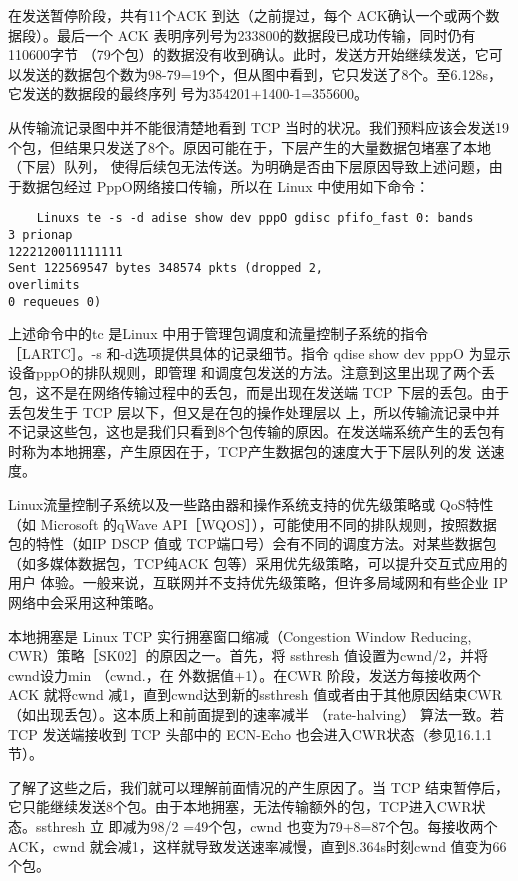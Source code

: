 在发送暂停阶段，共有11个ACK 到达（之前提过，每个 ACK确认一个或两个数据段）。最后一个 ACK 表明序列号为233800的数据段已成功传输，同时仍有110600字节
（79个包）的数据没有收到确认。此时，发送方开始继续发送，它可以发送的数据包个数为98-79=19个，但从图中看到，它只发送了8个。至6.128s，它发送的数据段的最终序列
号为354201+1400-1=355600。

从传输流记录图中并不能很清楚地看到 TCP 当时的状况。我们预料应该会发送19个包，但结果只发送了8个。原因可能在于，下层产生的大量数据包堵塞了本地（下层）队列，
使得后续包无法传送。为明确是否由下层原因导致上述问题，由于数据包经过 PppO网络接口传输，所以在 Linux 中使用如下命令：
\begin{verbatim}
    Linuxs te -s -d adise show dev pppO gdisc pfifo_fast 0: bands
3 prionap
1222120011111111
Sent 122569547 bytes 348574 pkts (dropped 2,
overlimits
0 requeues 0)
\end{verbatim}

上述命令中的tc 是Linux 中用于管理包调度和流量控制子系统的指令［LARTC］。-s 和-d选项提供具体的记录细节。指令 qdise show dev pppO 为显示设备pppO的排队规则，即管理
和调度包发送的方法。注意到这里出现了两个丢包，这不是在网络传输过程中的丢包，而是出现在发送端 TCP 下层的丢包。由于丢包发生于 TCP 层以下，但又是在包的操作处理层以
上，所以传输流记录中并不记录这些包，这也是我们只看到8个包传输的原因。在发送端系统产生的丢包有时称为本地拥塞，产生原因在于，TCP产生数据包的速度大于下层队列的发
送速度。

\begin{tcolorbox}
    Linux流量控制子系统以及一些路由器和操作系统支持的优先级策略或 QoS特性（如 Microsoft 的qWave API［WQOS］），可能使用不同的排队规则，按照数据
    包的特性（如IP DSCP 值或 TCP端口号）会有不同的调度方法。对某些数据包（如多媒体数据包，TCP纯ACK 包等）采用优先级策略，可以提升交互式应用的用户
    体验。一般来说，互联网并不支持优先级策略，但许多局域网和有些企业 IP 网络中会采用这种策略。
\end{tcolorbox}

本地拥塞是 Linux TCP 实行拥塞窗口缩减（Congestion Window Reducing, CWR）策略［SK02］的原因之一。首先，将 ssthresh 值设置为cwnd/2，并将 cwnd设力min （cwnd.，在
外数据值+1）。在CWR 阶段，发送方每接收两个 ACK 就将cwnd 减1，直到cwnd达到新的ssthresh 值或者由于其他原因结束CWR（如出现丢包）。这本质上和前面提到的速率减半
（rate-halving） 算法一致。若 TCP 发送端接收到 TCP 头部中的 ECN-Echo 也会进入CWR状态（参见16.1.1节）。

了解了这些之后，我们就可以理解前面情况的产生原因了。当 TCP 结束暂停后，它只能继续发送8个包。由于本地拥塞，无法传输额外的包，TCP进入CWR状态。ssthresh 立
即减为98/2 =49个包，cwnd 也变为79+8=87个包。每接收两个 ACK，cwnd 就会减1，这样就导致发送速率减慢，直到8.364s时刻cwnd 值变为66个包。

